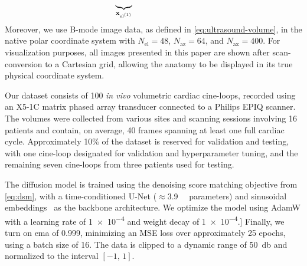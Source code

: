 \documentclass[journal,twoside,web,dvipsnames]{ieeecolor}          %
\begin{document}
\vspace{-1.5em}
\begin{equation*}
\underbrace{\hspace{2em}}_{{\mathbf{x}}_{\text{el}^{(1)}}}\hspace{7.2em}
\end{equation*}
Moreover, we use B-mode image data, as defined in \eqref{eq:ultrasound-volume}, in the native polar coordinate system with $N_\text{el}=48$, $N_\text{az}=64$, and $N_\text{ax}=400$. For visualization purposes, all images presented in this paper are shown after scan-conversion to a Cartesian grid, allowing the anatomy to be displayed in its true physical coordinate system.

Our dataset consists of 100 \emph{in vivo} volumetric cardiac cine-loops, recorded using an X5-1C matrix phased array transducer connected to a Philips EPIQ scanner. The volumes were collected from various sites and scanning sessions involving 16 patients and contain, on average, 40 frames spanning at least one full cardiac cycle. Approximately 10\% of the dataset is reserved for validation and testing, with one cine-loop designated for validation and hyperparameter tuning, and the remaining seven cine-loops from three patients used for testing.

The diffusion model is trained using the denoising score matching objective from \eqref{eq:dsm}, with a time-conditioned \mbox{U-Net} ($\approx$\SI{3.9}{\mega\nothing} parameters) and sinusoidal embeddings~\cite{pmlr-v70-gehring17a} as the backbone architecture. We optimize the model using AdamW with a learning rate of \num{1e-4} and weight decay of \num{1e-4}.] Finally, we turn on \acrfull{ema} of \num{0.999}, minimizing an MSE loss over approximately 25 epochs, using a batch size of 16. The data is clipped to a dynamic range of \SI{50}{\decibel} and normalized to the interval $[-1,\,1]$.
\end{document}
